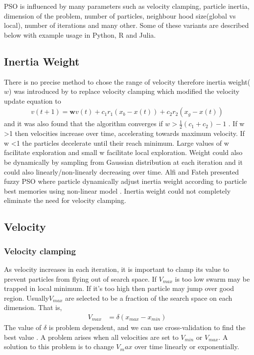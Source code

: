 \documentclass{article}
\begin{document}
PSO is influenced by many parameters such as velocity clamping, particle inertia, dimension of the problem, number of particles, neighbour hood size(global vs local), number of iterations and many other. Some of these variants are described below with example usage in Python, R and Julia.


\subsection{Inertia Weight}
There is no precise method to chose the range of velocity therefore inertia weight($w$) was introduced by \cite{shi1998modified} to replace velocity clamping which modified the velocity update equation to  
\begin{align*} v(t+1) = \boldsymbol{w} v(t) + c_1r_1(x_b - x(t)) + c_2r_2(x_g - x(t))
\end{align*} and it was also found that the algorithm converges if $w > \frac{1}{2}(c_1 + c_2) - 1$ \cite{van2007analysis}. If w \textgreater 1 then velocities increase over time, accelerating towards maximum velocity. If w \textless 1 the particles decelerate until their reach minimum. Large values of w facilitate exploration and small w facilitate local exploration. Weight could also be dynamically by sampling from Gaussian distribution at each iteration and it could also linearly/non-linearly decreasing over time. Alfi and Fateh presented fuzzy PSO where particle dynamically adjust inertia weight according to particle best memories using non-linear model \cite{alfi2011intelligent}. Inertia weight could not completely eliminate the need for velocity clamping.




\subsection{Velocity}

\subsubsection{Velocity clamping}
As velocity increases in each iteration, it is important to clamp its value to prevent particles from flying out of search space. If $V_{max}$ is too low swarm may be trapped in local minimum. If it's too high then particle may jump over good region. Usually$V_{max}$ are selected to be a fraction of the search space on each dimension. That is,
\begin{align*}
    V_{max} &=  \delta(x_{max} - x_{min})
\end{align*}
The value of $\delta$ is problem dependent, and we can use cross-validation to find the best value \cite{omran2004image}. A problem arises when all velocities are set to $V_{min}$ or $V_{max}$. A solution to this problem is to change $V_max$ over time linearly or exponentially.
\end{document}
